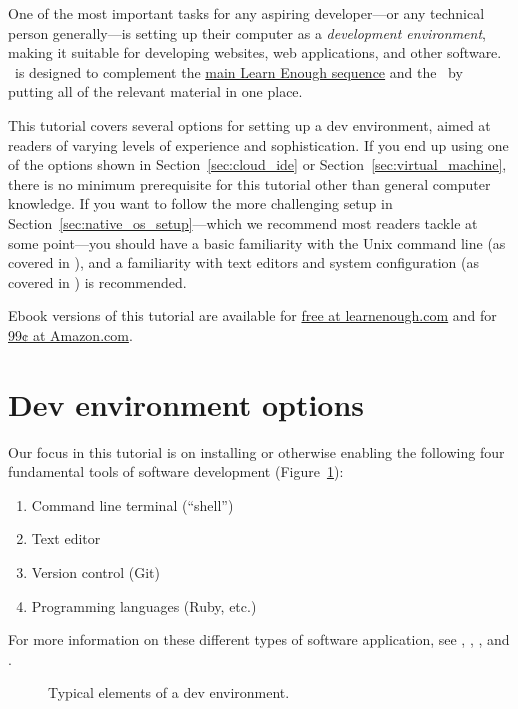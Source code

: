 
\noindent One of the most important tasks for any aspiring developer---or any technical person generally---is setting up their computer as a \emph{development environment}, making it suitable for developing websites, web applications, and other software. \ledev\ is designed to complement the \href{http://www.learnenough.com/tutorials}{main Learn Enough sequence} and the \rort\ by putting all of the relevant material in one place.

This tutorial covers several options for setting up a dev environment, aimed at readers of varying levels of experience and sophistication. If you end up using one of the options shown in Section~\ref{sec:cloud_ide} or Section~\ref{sec:virtual_machine}, there is no minimum prerequisite for this tutorial other than general computer knowledge. If you want to follow the more challenging setup in Section~\ref{sec:native_os_setup}---which we recommend most readers tackle at some point---you should have a basic familiarity with the Unix command line (as covered in \lecl), and a familiarity with text editors and system configuration (as covered in ) is recommended.

Ebook versions of this tutorial are available for \href{https://www.softcover.io/email-capture/28fdb94f/learn_enough_dev_environment}{free at learnenough.com} and for \href{https://www.amazon.com/Learn-Enough-Dev-Environment-Dangerous-ebook/dp/B01MTEQJ6E}{99¢ at Amazon.com}.

\section{Dev environment options} %
\label{sec:dev_environment_options}

Our focus in this tutorial is on installing or otherwise enabling the following four fundamental tools of software development (Figure~\ref{fig:dev_environment}):
\begin{enumerate}
  \item Command line terminal (``shell'')
  \item Text editor
  \item Version control (Git)
  \item Programming languages (Ruby, etc.)
\end{enumerate}
For more information on these different types of software application, see \lecl, , \leg, and \ler.

\begin{figure}
\begin{center}
\end{center}
\caption{Typical elements of a dev environment.\label{fig:dev_environment}}
\end{figure}

